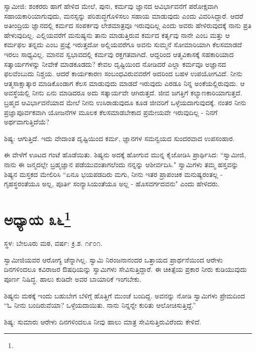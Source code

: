 ಸ್ವಾಮೀಜಿ: ಶಂಕರರು ಹಾಗೆ ಹೇಳಿದ ಮೇಲೆ, ಪುನಃ, ಕರ್ಮವು ಜ್ಞಾನದ ಆವಿರ್ಭಾವನೆಗೆ ಪರೋಕ್ಷವಾಗಿ ಸಹಾಯಕಾರಿಯಾಗುವುದು, ಮನಸ್ಸನ್ನು ಪರಿಶುದ್ಧಗೊಳಿಸಲು ಸಹಾಯ ಮಾಡುವುದು ಎಂದು ವಿವರಿಸಿದ್ದಾರೆ. ಆದರೆ ಅತೀಂದ್ರಿಯ ಜ್ಞಾನದಲ್ಲಿ ಕರ್ಮದ ಸಂಪರ್ಕವು ಲೇಶಮಾತ್ರವೂ ಇರುವುದಿಲ್ಲ ಎಂದು ಅವರು ಹೇಳಿರುವುದಕ್ಕೆ ನಾನು ಪ್ರತಿ ಹೇಳುವುದಿಲ್ಲ. ಎಲ್ಲಿಯವರೆಗೆ ಮನುಷ್ಯನು ತಾನು ಮಾಡುತ್ತಿರುವ ಕರ್ಮದ ಕರ್ತೃವು ನಾನೇ ಎಂಬ ಮತ್ತು ಆ ಕರ್ಮಫಲ ತನ್ನದು ಎಂಬ ಪ್ರಜ್ಞೆ ಇರುತ್ತದೋ ಅಲ್ಲಿಯವರೆಗೂ ಅವನು ಸುಮ್ಮನೆ ಸೋಮಾರಿಯಾಗಿ ಕೆಲಸಮಾಡದೆ ಇರಲು ಸಾಧ್ಯವಿಲ್ಲ. ಮಾನವ ಸ್ವಭಾವದಲ್ಲಿ ಕರ್ಮವು ರಕ್ತಗತವಾಗಿದೆ. ಆದ್ದರಿಂದ ಆತ್ಮವಿಕಾಸಕ್ಕೆ ಸಹಕಾರಿಯಾದ ಸತ್ಕಾರ್ಯಗಳನ್ನು ನೀವೇಕೆ ಮಾಡಕೂಡದು? ಕೇವಲ ದೃಷ್ಟಿಯಿಂದ ನೋಡಿದರೆ ಎಲ್ಲಾ ಕರ್ಮವೂ ಅಜ್ಞಾನದ ಫಲವೆಂಬುದು ನಿಶ್ಚಯ. ಆದರೆ ಕಾರ್ಯಕಾರಣ ಸಂಬಂಧವಿರುವವರೆಗೆ ಅದರಿಂದ ಬಹಳ ಉಪಯೋಗವಿದೆ. ನೀನು ಆತ್ಮಸಾಕ್ಷಾತ್ಕಾರ ಮಾಡಿಕೊಂಡಾಗ ಕೆಲಸ ಮಾಡುವುದು ಮಾಡದೆ ಇರುವುದು ಎರಡೂ ನಿನ್ನ ಅಂಕೆಯಲ್ಲಿರುವುದು. ಆ ಅವಸ್ಥೆಯಲ್ಲಿ ನೀನು ಏನು ಮಾಡಿದರೂ ಅದು ಸತ್ಕಾರ್ಯವೇ ಆಗಿರುತ್ತದೆ. ಜೀವ ಜಗತ್ತಿಗೆ ಕಲ್ಯಾಣಕಾರಿಯಾಗುತ್ತದೆ. ಬ್ರಹ್ಮದ ಆವಿರ್ಭಾವನೆಯಾದ ಮೇಲೆ ನೀನು ಉಸಿರಾಡುವುದೂ ಕೂಡ ಜೀವರಿಗೆ ಒಳ್ಳೆಯದಾಗುವುದಕ್ಕೆ. ನಂತರ ನೀನು ಪ್ರಜ್ಞಾಪೂರ್ವಕವಾಗಿ ಯೋಜನೆಗಳ ಮೂಲಕ ಕೆಲಸಮಾಡಬೇಕಾದ ಪ್ರಮೇಯವೇ ಇರುವುದಿಲ್ಲ - ನಿನಗೆ ಅರ್ಥವಾಗುತ್ತಿದೆಯೆ?

ಶಿಷ್ಯ: ಆಗುತ್ತಿದೆ. ಇದು ವೇದಾಂತ ದೃಷ್ಟಿಯಿಂದ ಕರ್ಮ, ಜ್ಞಾನಗಳ ಸಮನ್ವಯದ ಸುಂದರವಾದ ಉಪಸಂಹಾರ.

ಈ ವೇಳೆಗೆ ಊಟದ ಗಂಟೆ ಹೊಡೆಯಿತು. ಶಿಷ್ಯನು ಅದಕ್ಕೆ ಹೋಗುವ ಮುನ್ನ ಕೈಜೋಡಿಸಿ ಪ್ರಾರ್ಥಿಸಿದ: “ಸ್ವಾಮೀಜಿ, ನಾನು ಈ ಜನ್ಮದಲ್ಲೇ ಬ್ರಹ್ಮಜ್ಞಾನ ಪಡೆಯುವಂತಾಗಲೆಂದು ನನ್ನನ್ನು ಆಶೀರ್ವದಿಸಿ." ಸ್ವಾಮಿಗಳು ತಮ್ಮ ಹಸ್ತವನ್ನು ಶಿಷ್ಯನ ಮಸ್ತಕದ ಮೇಲಿರಿಸಿ “ಏನೂ ಭಯಪಡದಿರು ಮಗು, ನೀನು ಇತರ ಪ್ರಾಪಂಚಿಕ ಮನುಷ್ಯರಂತಲ್ಲ - ಗೃಹಸ್ಥರಂತೆಯೂ ಅಲ್ಲ, ಪೂರ್ತಿ ಸಂನ್ಯಾಸಿಯಂತೆಯೂ ಅಲ್ಲ - ಹೊಸವರ್ಗದವನು" ಎಂದು ಹೇಳಿದರು.

\newpage

\chapter[ಅಧ್ಯಾಯ ೩೬]{ಅಧ್ಯಾಯ ೩೬\protect\footnote{}}

\begin{center}
ಸ್ಥಳ: ಬೇಲೂರು ಮಠ, ವರ್ಷ: ಕ್ರಿ.ಶ. ೧೯೦೧.
\end{center}

ಸ್ವಾಮೀಜಿಯವರ ಆರೋಗ್ಯ ಚೆನ್ನಾಗಿಲ್ಲ. ಸ್ವಾಮಿ ನಿರಂಜನಾನಂದರ ಒತ್ತಾಯದ ಪ್ರಾರ್ಥನೆಯಿಂದ ಆರೇಳು ದಿನಗಳಿಂದಲೂ ಕವಿರಾಜರ ಔಷಧಿಯನ್ನು ಸ್ವಾಮಿಗಳು ಸೇವಿಸುತ್ತಿದ್ದಾರೆ. ಈ ಚಿಕಿತ್ಸೆಯ ಪ್ರಕಾರ ನೀರು ಕುಡಿಯುವುದು ಪೂರ್ಣ ನಿಷಿದ್ಧ. ಹಾಲು ಕುಡಿದೇ ಅವರ ಬಾಯಾರಿಕೆ ಇಂಗಬೇಕು.

ಶಿಷ್ಯನು ಮಠಕ್ಕೆ ಇಂದು ಬಹುಬೇಗ ಬೆಳಿಗ್ಗೆ ಹೊತ್ತಿಗೆ ಮುಂಚೆ ಬಂದಿದ್ದ. ಅವನನ್ನು ನೋಡಿ ಸ್ವಾಮಿಗಳು ಪ್ರೇಮದಿಂದ “ಓ ನೀನು ಬಂದಿರುವೆಯಾ? ಒಳ್ಳೆಯದಾಯಿತು. ನಾನು ನಿನ್ನನ್ನೇ ಕುರಿತು ಆಲೋಚಿಸುತ್ತಿದ್ದೆ.”

ಶಿಷ್ಯ: ಸುಮಾರು ಆರೇಳು ದಿನಗಳಿಂದಲೂ ನೀವು ಹಾಲು ಮಾತ್ರ ಸೇವಿಸುತ್ತಿರುವಿರೆಂದು ಕೇಳಿದೆ.

